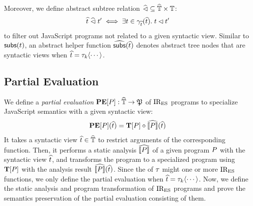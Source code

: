 % 
% 
% 
Moreover, we define abstract subtree relation $\widehat{\lhd} \subseteq \widehat{\mathbb{T}}
\times \mathbb{T}$:
\[
  \widehat{t} \; \widehat{\lhd} \; t' \iff \exists t \in \gamma_{\widehat{t}}(\widehat{t}). \;
  t \lhd t'
\]
to filter out JavaScript programs not related to a given syntactic view.
Similar to $\textsf{subs}(t)$, an abstract helper function $\widehat{\textsf{subs}}(\widehat{t})$
denotes abstract tree nodes that are syntactic views when $\widehat{t} = \tau_k
\langle \cdots \rangle$.



\subsection{Partial Evaluation}

We define a \textit{partial evaluation} $\textbf{PE}[P]: \widehat{\mathbb{T}} \rightarrow
\mathfrak{P}$ of $\text{IR}_\text{ES}$ programs to specialize JavaScript semantics with a given
syntactic view:
\[
  \textbf{PE}[P](\widehat{t}) = \textbf{T}[P] \circ \widehat{\llbracket{P}\rrbracket} (\widehat{t})
\]
It takes a syntactic view $\widehat{t} \in \widehat{\mathbb{T}}$ to restrict arguments of the
corresponding  function. Then, it performs a static analysis
$\widehat{\llbracket{P}\rrbracket}$ of a given program $P$ with the syntactic view $\widehat{t}$, and
transforms the program to a specialized program using $\textbf{T}[P]$ with
the analysis result $\widehat{\llbracket{P}\rrbracket}(\widehat{t})$.  Since the  of
$\tau$ might one or more $\text{IR}_\text{ES}$ functions, we only define the partial evaluation
when $\widehat{t} = \tau_k \langle \cdots \rangle$.  Now, we define the static
analysis and program transformation of $\text{IR}_\text{ES}$ programs and prove the semantics
preservation of the partial evaluation consisting of them.


